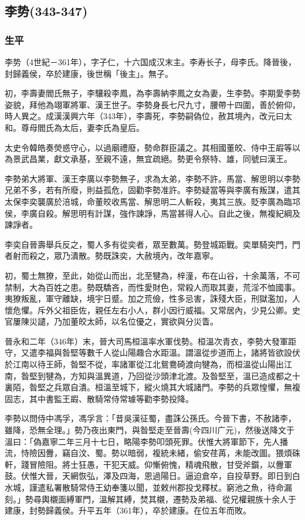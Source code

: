 
\subsection{李势\tiny(343-347)}

\subsubsection{生平}

李势（4世紀－361年），字子仁，十六国成汉末主。李寿长子，母李氏。降晉後，封歸義侯，卒於建康，後世稱「後主」。無子。

初，李壽妻閻氏無子，李驤殺李鳳，為李壽納李鳳之女為妻，生李勢。李期愛李勢姿貌，拜他為翊軍將軍、漢王世子。李勢身長七尺九寸，腰帶十四圍，善於俯仰，時人異之。成漢漢興六年（343年），李壽死，李勢嗣偽位，赦其境內，改元曰太和。尊母閻氏為太后，妻李氏為皇后。

太史令韓皓奏熒惑守心，以過廟禮廢，勢命群臣議之。其相國董皎、侍中王嘏等以為景武昌業，獻文承基，至親不遠，無宜疏絕。勢更令祭特、雄，同號曰漢王。

李勢弟大將軍、漢王李廣以李勢無子，求為太弟，李勢不許。馬當、解思明以李勢兄弟不多，若有所廢，則益孤危，固勸李勢准許。李勢疑當等與李廣有叛謀，遣其太保李奕襲廣於涪城，命董皎收馬當、解思明二人斬殺，夷其三族。貶李廣為臨邛侯，李廣自殺。解思明有計謀，強作諫諍，馬當甚得人心。自此之後，無複紀綱及諫諍者。

李奕自晉壽舉兵反之，蜀人多有從奕者，眾至數萬。勢登城距戰。奕單騎突門，門者射而殺之，眾乃潰散。勢既誅奕，大赦境內，改年嘉寧。

初，蜀土無獠，至此，始從山而出，北至犍為，梓潼，布在山谷，十余萬落，不可禁制，大為百姓之患。勢既驕吝，而性愛財色，常殺人而取其妻，荒淫不恤國事。夷獠叛亂，軍守離缺，境宇日蹙。加之荒儉，性多忌害，誅殘大臣，刑獄濫加，人懷危懼。斥外父祖臣佐，親任左右小人，群小因行威福。又常居內，少見公卿。史官屢陳災譴，乃加董皎太師，以名位優之，實欲與分災眚。

晉永和二年（346年）末，晉大司馬桓溫率水軍伐勢。桓溫次青衣，李勢大發軍距守，又遣李福與昝堅等數千人從山陽趣合水距溫。謂溫從步道而上，諸將皆欲設伏於江南以待王師，昝堅不從，率諸軍從江北鴛鴦碕渡向犍為，而桓溫從山陽出江南，昝堅到犍為，方知與溫異道，乃回從沙頭津北渡。及昝堅至，溫已造成都之十裏陌，昝堅之兵眾自潰。桓溫至城下，縱火燒其大城諸門。李勢的兵眾惶懼，無複固志，其中書監王嘏、散騎常侍常璩等勸李勢投降。

李勢以問侍中馮孚，馮孚言：「昔吳漢征蜀，盡誅公孫氏。今晉下書，不赦諸李，雖降，恐無全理。」勢乃夜出東門，與昝堅走至晉壽(今四川广元)，然後送降文于溫曰：「偽嘉寧二年三月十七日，略陽李勢叩頭死罪。伏惟大將軍節下，先人播流，恃險因釁，竊自汶、蜀。勢以暗弱，複統未緒，偷安荏苒，未能改圖。猥煩硃軒，踐冒險阻。將士狂愚，干犯天威。仰慚俯愧，精魂飛散，甘受斧鑕，以釁軍鼓。伏惟大晉，天網恢弘，澤及四海，恩過陽日。逼迫倉卒，自投草野。即日到白水城，謹遣私署散騎常侍王幼奉箋以聞，並敕州郡投戈釋杖。窮池之魚，待命漏刻。」勢尋輿櫬面縛軍門，溫解其縛，焚其櫬，遷勢及弟福、從兄權親族十余人于建康，封勢歸義侯。升平五年（361年），卒於建康。在位五年而敗。

